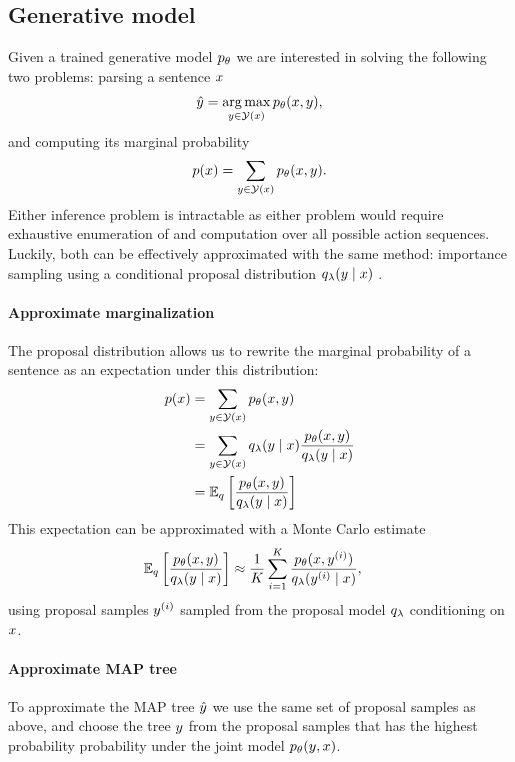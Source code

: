 \subsection{Generative model}
Given a trained generative model $p_{\theta}$ we are interested in solving the following two problems: parsing a sentence $x$
\begin{align*}
  \hat{y} = \operatorname*{arg\,max}_{ y \in \mathcal{Y}(x) } p_{\theta}(x, y),
\end{align*}
and computing its marginal probability
\begin{align*}
  p(x) = \sum_{ y \in \mathcal{Y}(x) } p_{\theta}(x, y).
\end{align*}
Either inference problem is intractable as either problem would require exhaustive enumeration of and computation over all possible action sequences.  Luckily, both can be effectively approximated with the same method: importance sampling using a conditional proposal distribution $q_{\lambda}(y \mid x)$ \citep{dyer2016rnng}.

\paragraph{Approximate marginalization}
The proposal distribution allows us to rewrite the marginal probability of a sentence as an expectation under this distribution:
\begin{align*}
  p (x)
    &= \sum_{y  \in \mathcal{Y}(x)} p_{\theta}(x, y) \\
    &= \sum_{y  \in \mathcal{Y}(x)} q_{\lambda}(y \mid x) \frac{p_{\theta}(x,y )}{q_{\lambda}(y \mid x)} \\
    &= \operatorname{\mathbb{E}}_{q} \bigg[\frac{p_{\theta}(x,y )}{q_{\lambda}(y \mid  x)} \bigg] \\
\end{align*}
This expectation can be approximated with a Monte Carlo estimate
\begin{align}
  \operatorname{\mathbb{E}}_{q} \bigg[\frac{p_{\theta}(x,y )}{q_{\lambda}(y \mid x)} \bigg]
    &\approx \frac{1}{K}\sum_{i=1}^K  \frac{p_{\theta}( x, y^{(i)} )}{q_{\lambda}(y^{(i)} \mid x)},
\end{align}
using proposal samples $y^{(i)}$ sampled from the proposal model $q_{\lambda}$ conditioning on $x$.

\paragraph{Approximate MAP tree}
To approximate the MAP tree $\hat{y}$ we use the same set of proposal samples as above, and choose the tree $y$ from the proposal samples that has the highest probability probability under the joint model $p_{\theta}( y, x)$.

